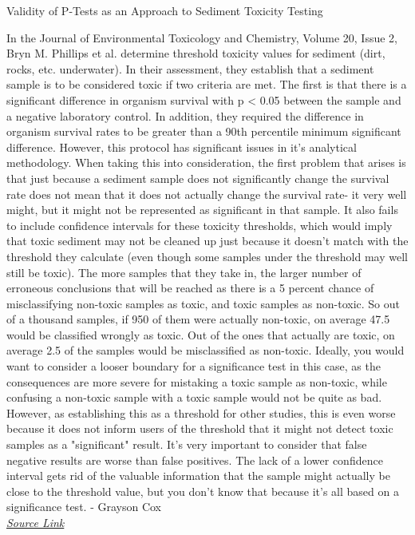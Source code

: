\documentclass{article}
\begin{document}
    \centerline{Validity of P-Tests as an Approach to Sediment Toxicity Testing}
    \indent In the Journal of Environmental Toxicology and Chemistry, Volume 20, Issue 2, Bryn M. Phillips et al. determine threshold toxicity values for sediment (dirt, rocks, etc. underwater). In their assessment, they establish that a sediment sample is to be considered toxic if two criteria are met. The first is that there is a significant difference in organism survival with p < 0.05 between the sample and a negative laboratory control. In addition, they required the difference in organism survival rates to be greater than a 90th percentile minimum significant difference. However, this protocol has significant issues in it's analytical methodology. When taking this into consideration, the first problem that arises is that just because a sediment sample does not significantly change the survival rate does not mean that it does not actually change the survival rate- it very well might, but it might not be represented as significant in that sample. It also fails to include confidence intervals for these toxicity thresholds, which would imply that toxic sediment may not be cleaned up just because it doesn't match with the threshold they calculate (even though some samples under the threshold may well still be toxic). The more samples that they take in, the larger number of erroneous conclusions that will be reached as there is a 5 percent chance of misclassifying non-toxic samples as toxic, and toxic samples as non-toxic. So out of a thousand samples, if 950 of them were actually non-toxic, on average 47.5 would be classified wrongly as toxic. Out of the ones that actually are toxic, on average 2.5 of the samples would be misclassified as non-toxic. Ideally, you would want to consider a looser boundary for a significance test in this case, as the consequences are more severe for mistaking a toxic sample as non-toxic, while confusing a non-toxic sample with a toxic sample would not be quite as bad. However, as establishing this as a threshold for other studies, this is even worse because it does not inform users of the threshold that it might not detect toxic samples as a "significant" result. It's very important to consider that false negative results are worse than false positives. The lack of a lower confidence interval gets rid of the valuable information that the sample might actually be close to the threshold value, but you don't know that because it's all based on a significance test.
    - Grayson Cox 
    \\
    \href{https://setac.onlinelibrary.wiley.com/doi/full/10.1002/etc.5620200218?casa_token=jjDz7jm0-8cAAAAA\%3AkYSAWfP5aaMoDQPezOYtDqe961eoOYyo0DPda7BSMkPPULjZyfcERBB0POyrtg8sztZhKgSAY-kyK6ZE}{\textit{Source Link}}
    
\end{document}
